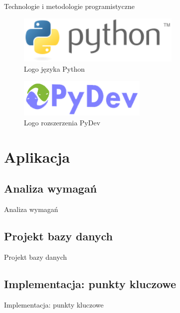 \documentclass{beamer}
\begin{document}
\begin{frame}{Technologie i metodologie programistyczne}
\begin{minipage}[b]{.48\textwidth}
\begin{figure}
\includegraphics[width=0.7\textwidth]{img/py}
\caption{Logo języka Python\cite{python}}
\end{figure}
\begin{figure}
\includegraphics[width=0.55\textwidth]{img/pydev}
\caption{Logo rozszerzenia PyDev\cite{pydev}}
\end{figure}

\end{minipage}\hfill
\end{frame}

\section{Aplikacja}

\subsection{Analiza wymagań}
\begin{frame}{Analiza wymagań} 

\end{frame}


\subsection{Projekt bazy danych}
\begin{frame}{Projekt bazy danych}

\end{frame}


\subsection{Implementacja: punkty kluczowe}
\begin{frame}{Implementacja: punkty kluczowe} 

\end{frame}
\end{document}
